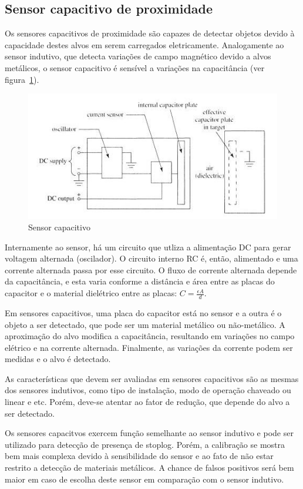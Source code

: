 
\subsection{Sensor capacitivo de proximidade}
Os sensores capacitivos de proximidade são capazes de detectar objetos devido à capacidade destes alvos em serem carregados eletricamente. Analogamente ao sensor indutivo, que detecta variações de campo magnético devido a alvos metálicos, o sensor capacitivo é sensível a variações na capacitância (ver figura~\ref{capacitivo_1}).

\begin{figure}[H]
    \centering
    \includegraphics[width=0.8\columnwidth]{figs/capacitivo/1.jpg}
    \caption{Sensor capacitivo}
    \label{capacitivo_1}
\end{figure}

Internamente ao sensor, há um circuito que utliza a alimentação DC para gerar voltagem alternada (oscilador). O circuito interno RC é, então, alimentado e uma corrente alternada passa por esse circuito. O fluxo de corrente alternada depende da capacitância, e esta varia  conforme a distância e área entre as placas do capacitor e o material dielétrico entre as placas: $C = \frac{\epsilon A}{d}$.

Em sensores capacitivos, uma placa do capacitor está no sensor e a outra é o objeto a ser detectado, que pode ser um material metálico ou não-metálico. A aproximação do alvo modifica a capacitância, resultando em variações no campo elétrico e na corrente alternada. Finalmente, as variações da corrente podem ser medidas e o alvo é detectado.

As características que devem ser avaliadas em sensores capacitivos são as mesmas dos sensores indutivos, como tipo de instalação, modo de operação chaveado ou linear e etc. Porém, deve-se atentar ao fator de redução, que depende do alvo a ser detectado.

 Os sensores capacitvos exercem função semelhante ao sensor indutivo e pode ser utilizado para detecção de presença de stoplog. Porém, a calibração se mostra bem mais complexa devido à sensibilidade do sensor e ao fato de não estar restrito a detecção de materiais metálicos. A chance de falsos positivos será bem maior em caso de escolha deste sensor em comparação com o sensor indutivo.


